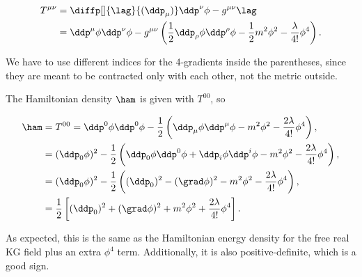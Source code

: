 \begin{align}
    T^{\mu\nu} &= \diffp[]{\lag}{(\ddp_{\mu})}\ddp^{\nu}\phi - g^{\mu\nu}\lag \\
    &= \ddp^{\mu}\phi\ddp^{\nu}\phi - g^{\mu\nu}\left( \frac{1}{2}\ddp_{\rho}\phi\ddp^{\rho}\phi - \frac{1}{2}m^2\phi^2 - \frac{\lambda}{4!}\phi^4 \right).
\end{align}

We have to use different indices for the 4-gradients inside the parentheses, since they are meant to be contracted only with each other, not the metric outside.

The Hamiltonian density $\ham$ is given with $T^{00}$, so

\begin{align*}
    \ham &= T^{00} = \ddp^0\phi\ddp^0\phi - \frac{1}{2}\left(\ddp_{\mu}\phi\ddp^{\mu}\phi - m^2\phi^2 - \frac{2\lambda}{4!}\phi^4\right), \\
    &= (\ddp_0\phi)^2 - \frac{1}{2}\left( \ddp_0\phi\ddp^0\phi + \ddp_i\phi\ddp^i\phi - m^2\phi^2 - \frac{2\lambda}{4!}\phi^4 \right), \\
    &= (\ddp_0\phi)^2 - \frac{1}{2}\left( (\ddp_0)^2 - (\grad\phi)^2 - m^2\phi^2 - \frac{2\lambda}{4!}\phi^4 \right), \\
    &= \frac{1}{2} \left[ (\ddp_0)^2 + (\grad\phi)^2 + m^2\phi^2 + \frac{2\lambda}{4!}\phi^4  \right].
\end{align*}

As expected, this is the same as the Hamiltonian energy density for the free real KG field plus an extra $\phi^4$ term. Additionally, it is also positive-definite, which is a good sign.